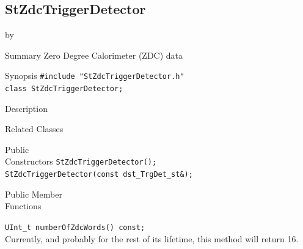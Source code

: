 \documentclass[twoside]{article}
\newcommand{\entrylabel}[1]{\mbox{\textbf{{#1}}}\hfil}%
\newenvironment{entry}
{\begin{list}{}%
    {\renewcommand{\makelabel}{\entrylabel}%
     \setlength{\labelwidth}{90pt}%
     \setlength{\leftmargin}{\labelwidth}
     \advance\leftmargin by \labelsep%
      }%
    }%
  {\end{list}}
\newcommand{\Entrylabel}[1]%
{\raisebox{0pt}[1ex][0pt]{\makebox[\labelwidth][l]%
    {\parbox[t]{\labelwidth}{\hspace{0pt}\textbf{{#1}}}}}}
\newenvironment{Entry}%
{\renewcommand{\entrylabel}{\Entrylabel}\begin{entry}}%
  {\end{entry}}
\begin{document}
\subsection{StZdcTriggerDetector}
\label{sec:StZdcTriggerDetector}
\begin{Entry}
\item[Summary] Zero Degree Calorimeter (ZDC) data
\item[Synopsis]
    \verb+#include "StZdcTriggerDetector.h"+\\
    \verb+class StZdcTriggerDetector;+\\
\item[Description]
\item[Related Classes]
    
\item[Public\\ Constructors]
    \verb+StZdcTriggerDetector();+\\
    \verb+StZdcTriggerDetector(const dst_TrgDet_st&);+\\
\item[Public Member\\ Functions]

    \verb+UInt_t numberOfZdcWords() const;+\\
    Currently, and probably for the rest of its lifetime, this method
    will return 16.
    

\end{Entry}
\end{document}

